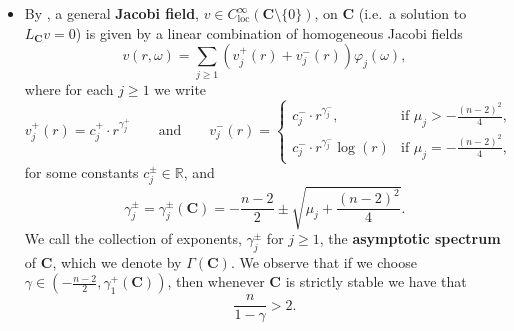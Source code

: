 \documentclass[12pt]{article}
\begin{document}
\begin{itemize}
    \item By \cite{CHS84}, a general \textbf{Jacobi field}, $v \in C_\mathrm{loc}^\infty(\mathbf{C} \setminus \{0\})$, on $\mathbf{C}$ (i.e.~a solution to $L_\mathbf{C}v = 0$) is given by a linear combination of homogeneous Jacobi fields
    \begin{equation*}
        v(r, \omega) = \sum_{j \geq 1} ( v_j^+(r) + v_j^-(r)) \varphi_j(\omega), 
    \end{equation*}
    where for each $j \geq 1$ we write
    \begin{equation*}
        v_j^+(r) = c_j^+ \cdot r^{\gamma_j^+} \qquad \text{and} \qquad v_j^-(r) = \begin{cases}
    c_j^- \cdot r^{\gamma_j^-}, & \text{if $\mu_j > - \frac{(n - 2)^2}{4}$}, \\
    c_j^- \cdot r^{\gamma_j^-} \log(r) & \text{if $\mu_j = -  \frac{(n - 2)^2}{4}$}, 
        \end{cases}
    \end{equation*}
    for some constants $c_j^\pm \in \mathbb{R}$, and
    \begin{equation*}
        \gamma_j^\pm = \gamma_j^\pm(\mathbf{C}) = - \frac{n - 2}{2} \pm \sqrt{\mu_j + \frac{(n - 2)^2}{4}}.
    \end{equation*}
    We call the collection of exponents, $\gamma^\pm_j$ for $j \geq 1$, the \textbf{asymptotic spectrum} of $\mathbf{C}$, which we denote by $\Gamma(\mathbf{C})$. We observe that if we choose $\gamma\in(-\frac{n-2}{2},\gamma_1^+(\mathbf C))$, then whenever $\mathbf{C}$ is strictly stable we have that
    \begin{equation}\label{eqn: super-quadratic exponent}
        \frac{n}{1-\gamma} >2.
    \end{equation}


\end{itemize}
\end{document}
